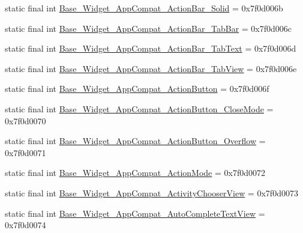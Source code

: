 \begin{DoxyCompactItemize}
\item 
static final int \mbox{\hyperlink{classandroid_1_1support_1_1v7_1_1appcompat_1_1_r_1_1style_a78e5768624be8e6fef216b3d4292c06d}{Base\+\_\+\+Widget\+\_\+\+App\+Compat\+\_\+\+Action\+Bar\+\_\+\+Solid}} = 0x7f0d006b
\item 
static final int \mbox{\hyperlink{classandroid_1_1support_1_1v7_1_1appcompat_1_1_r_1_1style_aeadd677d9db8698be561b80a977d6d06}{Base\+\_\+\+Widget\+\_\+\+App\+Compat\+\_\+\+Action\+Bar\+\_\+\+Tab\+Bar}} = 0x7f0d006c
\item 
static final int \mbox{\hyperlink{classandroid_1_1support_1_1v7_1_1appcompat_1_1_r_1_1style_aaca3832573f385e5f197da3a0e9c5571}{Base\+\_\+\+Widget\+\_\+\+App\+Compat\+\_\+\+Action\+Bar\+\_\+\+Tab\+Text}} = 0x7f0d006d
\item 
static final int \mbox{\hyperlink{classandroid_1_1support_1_1v7_1_1appcompat_1_1_r_1_1style_acc9a184f5947dff276d83a0e0c52f9cf}{Base\+\_\+\+Widget\+\_\+\+App\+Compat\+\_\+\+Action\+Bar\+\_\+\+Tab\+View}} = 0x7f0d006e
\item 
static final int \mbox{\hyperlink{classandroid_1_1support_1_1v7_1_1appcompat_1_1_r_1_1style_acbbde3a0af3ff2fec800b3cf26b6cb43}{Base\+\_\+\+Widget\+\_\+\+App\+Compat\+\_\+\+Action\+Button}} = 0x7f0d006f
\item 
static final int \mbox{\hyperlink{classandroid_1_1support_1_1v7_1_1appcompat_1_1_r_1_1style_a92cb61a7ba81c923c135814c99b115ec}{Base\+\_\+\+Widget\+\_\+\+App\+Compat\+\_\+\+Action\+Button\+\_\+\+Close\+Mode}} = 0x7f0d0070
\item 
static final int \mbox{\hyperlink{classandroid_1_1support_1_1v7_1_1appcompat_1_1_r_1_1style_ac6f65da34073ebe5e8c6d51f5d952d38}{Base\+\_\+\+Widget\+\_\+\+App\+Compat\+\_\+\+Action\+Button\+\_\+\+Overflow}} = 0x7f0d0071
\item 
static final int \mbox{\hyperlink{classandroid_1_1support_1_1v7_1_1appcompat_1_1_r_1_1style_a714062b6eda38c04eaa0ecc46419e4de}{Base\+\_\+\+Widget\+\_\+\+App\+Compat\+\_\+\+Action\+Mode}} = 0x7f0d0072
\item 
static final int \mbox{\hyperlink{classandroid_1_1support_1_1v7_1_1appcompat_1_1_r_1_1style_a763df5f9b4377366ab96cdddb07b074b}{Base\+\_\+\+Widget\+\_\+\+App\+Compat\+\_\+\+Activity\+Chooser\+View}} = 0x7f0d0073
\item 
static final int \mbox{\hyperlink{classandroid_1_1support_1_1v7_1_1appcompat_1_1_r_1_1style_aba92e3e484b4dac3d7519aaf47a1a941}{Base\+\_\+\+Widget\+\_\+\+App\+Compat\+\_\+\+Auto\+Complete\+Text\+View}} = 0x7f0d0074
\item 

\end{DoxyCompactItemize}
